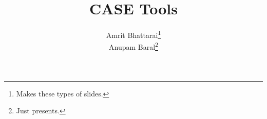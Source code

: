 %
%
%
% 
%
%
%
% 
\documentclass[14pt, aspectratio=169]{beamer}
\usepackage[utf8]{inputenc}
\usepackage{xcolor}



\title{CASE Tools}
\author{Amrit Bhattarai\thanks{Makes these types of slides.}\\Anupam Baral\thanks{Just presents.}}



\maketitle

\begin{frame}{What are \textbf{CASE Tools}?}
	\begin{itemize}
		\item<1-> \textbf{CASE} stands for \textcolor{emphasis}{Computer-Aided Software Engineering}.
		\item<1-> \textbf{CASE Tools} help system analysts to:
			\begin{enumerate}
				\item<2-> Develop information systems.
				\item<2-> Maintain information systems.
			\end{enumerate}
		\item<3-> These tools aim to \textcolor{emphasis}{automate} the software development lifecycle.
	\end{itemize}
\end{frame}

